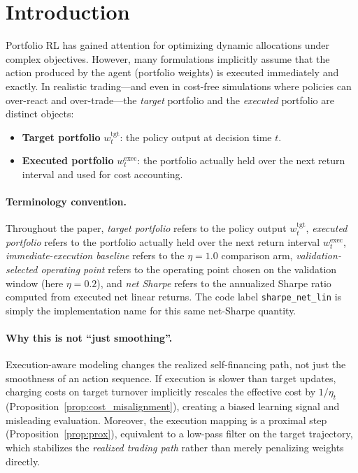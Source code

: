 \documentclass[10pt,twocolumn]{article}
\newcommand{\wexec}{w^{\mathrm{exec}}}
\newcommand{\wtgt}{w^{\mathrm{tgt}}}
\begin{document}
\section{Introduction}
Portfolio RL has gained attention for optimizing dynamic allocations under complex objectives. However, many formulations implicitly assume that the action produced by the agent (portfolio weights) is executed immediately and exactly. In realistic trading---and even in cost-free simulations where policies can over-react and over-trade---the \emph{target} portfolio and the \emph{executed} portfolio are distinct objects:
\begin{itemize}[leftmargin=*,itemsep=1pt]
\item \textbf{Target portfolio} $\wtgt_t$: the policy output at decision time $t$.
\item \textbf{Executed portfolio} $\wexec_t$: the portfolio actually held over the next return interval and used for cost accounting.
\end{itemize}

\paragraph{Terminology convention.}
Throughout the paper, \emph{target portfolio} refers to the policy output $\wtgt_t$, \emph{executed portfolio} refers to the portfolio actually held over the next return interval $\wexec_t$, \emph{immediate-execution baseline} refers to the $\eta=1.0$ comparison arm, \emph{validation-selected operating point} refers to the operating point chosen on the validation window (here $\eta=0.2$), and \emph{net Sharpe} refers to the annualized Sharpe ratio computed from executed net linear returns. The code label \texttt{sharpe\_net\_lin} is simply the implementation name for this same net-Sharpe quantity.

\paragraph{Why this is not ``just smoothing''.}
Execution-aware modeling changes the realized self-financing path, not just the smoothness of an action sequence. If execution is slower than target updates, charging costs on target turnover implicitly rescales the effective cost by $1/\eta_t$ (Proposition~\ref{prop:cost_misalignment}), creating a biased learning signal and misleading evaluation. Moreover, the execution mapping is a proximal step (Proposition~\ref{prop:prox}), equivalent to a low-pass filter on the target trajectory, which stabilizes the \emph{realized trading path} rather than merely penalizing weights directly.
\end{document}
